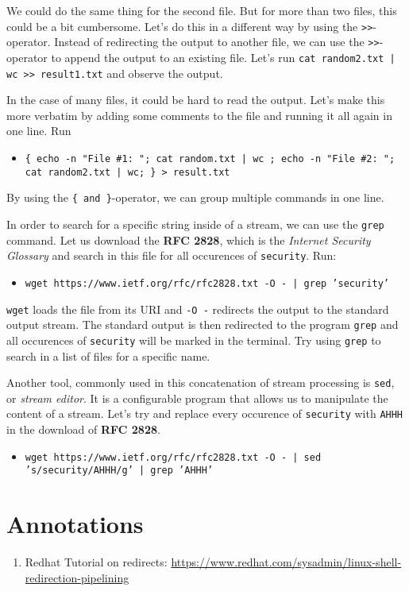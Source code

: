 \documentclass{dcbl/challenge}
\begin{document}
\begin{aufgabe}
    We could do the same thing for the second file.
    But for more than two files, this could be a bit cumbersome.
    Let's do this in a different way by using the \texttt{>>}-operator.
    Instead of redirecting the output to another file, we can use the \texttt{>>}-operator to append the output to an existing file.
    Let's run \texttt{cat random2.txt | wc >> result1.txt} and observe the output.
\end{aufgabe}

\begin{aufgabe}
    In the case of many files, it could be hard to read the output.
    Let's make this more verbatim by adding some comments to the file and running it all again in one line. Run\\
    \begin{itemize}
        \item \texttt{\{ echo -n "File \#1: "; cat random.txt | wc ; echo -n "File \#2: "; cat random2.txt | wc; \} > result.txt}
    \end{itemize}
    By using the \texttt{\{ and \}}-operator, we can group multiple commands in one line.
\end{aufgabe}

\begin{aufgabe}
    In order to search for a specific string inside of a stream, we can use the \texttt{grep} command.
    Let us download the \textbf{RFC 2828}, which is the \textit{Internet Security Glossary} and search in this file for all occurences of \texttt{security}.
    Run: \\
    \begin{itemize}
        \item \texttt{wget https://www.ietf.org/rfc/rfc2828.txt -O - | grep 'security'}
    \end{itemize}
    \texttt{wget} loads the file from its URI and \texttt{-O -} redirects the output to the standard output stream.
    The standard output is then redirected to the program \texttt{grep} and all occurences of \texttt{security} will be marked in the terminal.
    Try using \texttt{grep} to search in a list of files for a specific name.
\end{aufgabe}

\begin{aufgabe}
    Another tool, commonly used in this concatenation of stream processing is \texttt{sed}, or \textit{stream editor}.
    It is a configurable program that allows us to manipulate the content of a stream.
    Let's try and replace every occurence of \texttt{security} with \texttt{AHHH} in the download of \textbf{RFC 2828}.
    \begin{itemize}
        \item \texttt{wget https://www.ietf.org/rfc/rfc2828.txt -O - | sed 's/security/AHHH/g' | grep 'AHHH'}
    \end{itemize}
\end{aufgabe}

\section*{Annotations}
\begin{enumerate}
    \item Redhat Tutorial on redirects: \url{https://www.redhat.com/sysadmin/linux-shell-redirection-pipelining}
\end{enumerate}
\end{document}
